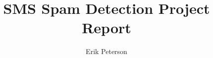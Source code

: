 \documentclass[10pt,journal,compsoc]{IEEEtran}
\begin{document}
%
\title{SMS Spam Detection Project Report}
%
%
%
%

\author{Erik Peterson}%

% 
%
\end{document}
